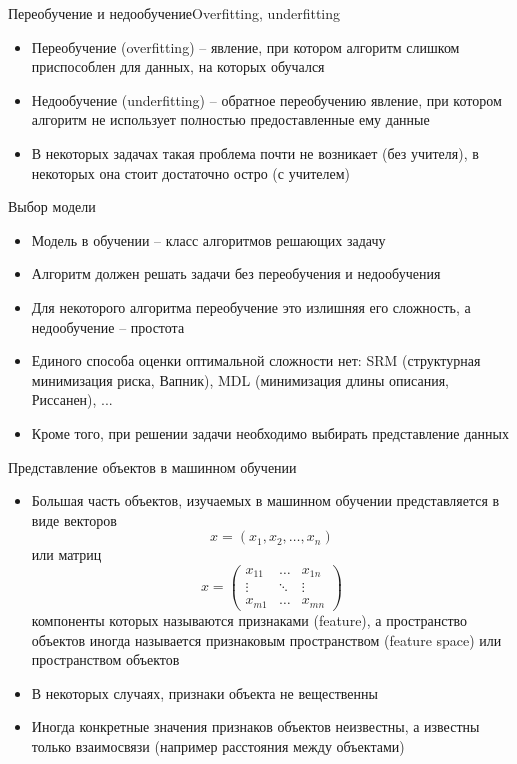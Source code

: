\documentclass[compress,red,unicode]{beamer}
\begin{document}
\begin{frame}{Переобучение и недообучение}{Overfitting, underfitting}
\begin{itemize}
	\item Переобучение (overfitting) -- явление, при котором алгоритм слишком приспособлен для данных, на которых обучался
	\item Недообучение (underfitting) -- обратное переобучению явление, при котором алгоритм не использует полностью предоставленные ему данные
	\item В некоторых задачах такая проблема почти не возникает (без учителя), в некоторых она стоит достаточно остро (с учителем)

\end{itemize}
\end{frame}

\begin{frame}{Выбор модели}
\begin{itemize}
	\item Модель в обучении -- класс алгоритмов решающих задачу
	\item Алгоритм должен решать задачи без переобучения и недообучения
	\item Для некоторого алгоритма переобучение это излишняя его сложность, а недообучение -- простота
	\item Единого способа оценки оптимальной сложности нет: SRM (структурная минимизация риска, Вапник), MDL (минимизация длины описания, Риссанен), ...
	\item Кроме того, при решении задачи необходимо выбирать представление данных
\end{itemize}
\end{frame}

\begin{frame}{Представление объектов в машинном обучении}
\begin{itemize}
	\item Большая часть объектов, изучаемых в машинном обучении представляется в виде векторов
	$$
	x = (x_1, x_2, \dots, x_n)
	$$
	или матриц
	$$
	x = 
	\begin{pmatrix} 
	x_{11} & \dots & x_{1n} \\ 
	\vdots & \ddots & \vdots \\
	x_{m1} & \dots & x_{mn}
	\end{pmatrix}
	$$
	компоненты которых называются признаками (feature), а пространство объектов иногда называется признаковым  пространством (feature space) или пространством объектов
	\item В некоторых случаях, признаки объекта не вещественны
	\item Иногда конкретные значения признаков объектов неизвестны, а известны только взаимосвязи (например расстояния между объектами)
\end{itemize}
\end{frame}
\end{document}
